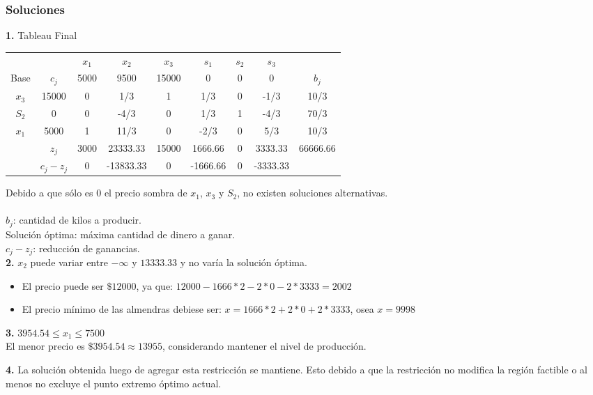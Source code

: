 \subsubsection{Soluciones}

\textbf{1.} Tableau Final
\begin{center}

\begin{tabular}{ c c | c | c | c | c | c | c | c }
		&	& $x_1$ & $x_2$ & $x_3$ & $s_1$ & $s_2$ & $s_3$ &\\
Base & $c_j$	& 5000	& 9500	& 15000	&   0	& 0 		&   0	& $b_j$\\
\hline
$x_3$ & 15000 & 0 & 1/3 & 1 & 1/3 & 0 & -1/3 & 10/3\\
$S_2$ & 0	  & 0  & -4/3 & 0 & 1/3 & 1 & -4/3 & 70/3\\
$x_1$ & 5000  & 1  & 11/3 & 0 & -2/3 & 0 & 5/3 & 10/3\\
\hline
& $z_j$		& 3000  & 23333.33  & 15000 & 1666.66 & 0 & 3333.33  & 66666.66\\
& $c_j - z_j$	& 0  & -13833.33  & 0 & -1666.66 & 0 & -3333.33 &\\
\end{tabular}

\end{center}

Debido a que sólo es 0 el precio sombra de $x_1$, $x_3$ y $S_2$, no existen soluciones alternativas.\\\\
$b_j$: cantidad de kilos a producir.\\
Solución óptima: máxima cantidad de dinero a ganar.\\
$c_j - z_j$: reducción de ganancias.
\\

\textbf{2.} $x_2$ puede variar entre $-\infty$ y $13333.33$ y no varía la solución óptima.
\begin{itemize}
\item El precio puede ser $\$12000$, ya que: $12000 - 1666*2 - 2*0 - 2*3333 = 2002$
\item El precio mínimo de las almendras debiese ser: $x=1666*2+2*0+2*3333$, osea $x=9998$
\end{itemize}


\textbf{3.} $3954.54 \leq x_1 \leq 7500$\\
El menor precio es $\$3954.54 \approx 13955$, considerando mantener el nivel de producción.

\textbf{4.} La solución obtenida luego de agregar esta restricción se mantiene. Esto debido a que la restricción no modifica la región factible o al menos no excluye el punto extremo óptimo actual.
